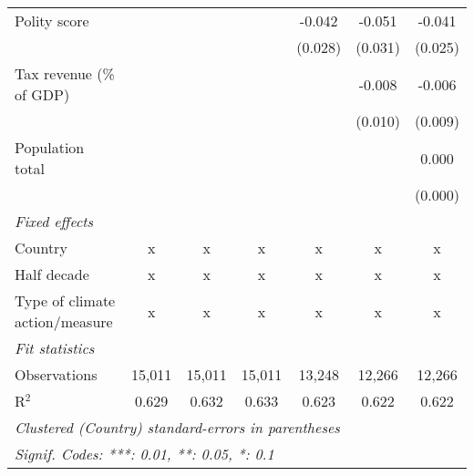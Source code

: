 \begin{tabular}{lcccccc}
   Polity score                                                      &              &               &                & -0.042         & -0.051         & -0.041\\   
                                                                     &              &               &                & (0.028)        & (0.031)        & (0.025)\\   
   Tax revenue (\% of GDP)                                           &              &               &                &                & -0.008         & -0.006\\   
                                                                     &              &               &                &                & (0.010)        & (0.009)\\   
   Population total                                                  &              &               &                &                &                & 0.000\\   
                                                                     &              &               &                &                &                & (0.000)\\   
   \emph{Fixed effects}\\
   Country                                                           & x            & x             & x              & x              & x              & x\\  
   Half decade                                                       & x            & x             & x              & x              & x              & x\\  
   Type of climate action/measure                                    & x            & x             & x              & x              & x              & x\\  
   \midrule \emph{Fit statistics}\\
   Observations                                                      & 15,011       & 15,011        & 15,011         & 13,248         & 12,266         & 12,266\\  
   R$^2$                                                             & 0.629        & 0.632         & 0.633          & 0.623          & 0.622          & 0.622\\  
   \midrule
   \multicolumn{7}{l}{\emph{Clustered (Country) standard-errors in parentheses}}\\
   \multicolumn{7}{l}{\emph{Signif. Codes: ***: 0.01, **: 0.05, *: 0.1}}\\
\end{tabular}
\par\endgroup


